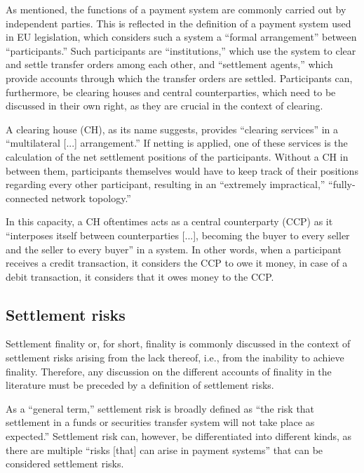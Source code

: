 As mentioned, the functions of a payment system are commonly carried out by independent parties.
This is reflected in the definition of a payment system used in EU legislation, which considers such a system a ``formal arrangement'' between ``participants.'' \autocite{eu1998sfd}
Such participants are ``institutions,'' which use the system to clear and settle transfer orders among each other, and ``settlement agents,'' which provide accounts through which the transfer orders are settled. \autocite{eu1998sfd}
Participants can, furthermore, be clearing houses and central counterparties, which need to be discussed in their own right, as they are crucial in the context of clearing.

A clearing house (CH), as its name suggests, provides ``clearing services'' in a ``multilateral [...] arrangement.'' \autocite[4]{bis2016cpmiglossary}
If netting is applied, one of these services is the calculation of the net settlement positions of the participants.
Without a CH in between them, participants themselves would have to keep track of their positions regarding every other participant, resulting in an ``extremely impractical,'' ``fully-connected network topology.'' \autocite[23]{megue2018}

In this capacity, a CH oftentimes acts as a central counterparty (CCP) as it ``interposes itself between counterparties [...], becoming the buyer to every seller and the seller to every buyer'' \autocite[3]{bis2016cpmiglossary} in a system.
In other words, when a participant receives a credit transaction, it considers the CCP to owe it money, in case of a debit transaction, it considers that it owes money to the CCP. \autocite[24]{megue2018}

\subsection{Settlement risks}

Settlement finality or, for short, finality is commonly discussed in the context of settlement risks arising from the lack thereof, i.e., from the inability to achieve finality.
Therefore, any discussion on the different accounts of finality in the literature must be preceded by a definition of settlement risks.

As a ``general term,'' settlement risk is broadly defined as ``the risk that settlement in a funds or securities transfer system will not take place as expected.'' \autocite[17]{bis2016cpmiglossary}
Settlement risk can, however, be differentiated into different kinds, as there are multiple ``risks [that] can arise in payment systems'' \autocite[5]{cpmi2001} that can be considered settlement risks.

